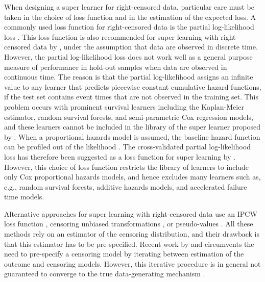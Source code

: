 \documentclass[a4paper,danish]{article}
\newcommand{\1}{\mathds{1}}
\theoremstyle{plain} %
\numberwithin{theorem}{section}
\theoremstyle{definition} %
\theoremstyle{remark}
\begin{document}
When designing a super learner for right-censored data, particular
care must be taken in the choice of loss function and in the
estimation of the expected loss. A commonly used loss function for
right-censored data is the partial log-likelihood loss
\citep[e.g.,][]{li2016regularized,yao2017deep,lee2018deephit,katzman2018deepsurv,gensheimer2019scalable,lee2021boosted,kvamme2021continuous}.
This loss function is also recommended for super learning with
right-censored data by \cite{polley2011-sl-cens}, under the assumption
that data are observed in discrete time. However, the partial
log-likelihood loss does not work well as a general purpose measure of
performance in hold-out samples when data are observed in continuous
time. The reason is that the partial log-likelihood assigns an
infinite value to any learner that predicts piecewise constant
cumulative hazard functions, if the test set contains event times that
are not observed in the training set. This problem occurs with
prominent survival learners including the Kaplan-Meier estimator,
random survival forests, and semi-parametric Cox regression models,
and these learners cannot be included in the library of the super
learner proposed by \cite{polley2011-sl-cens}. When a proportional
hazards model is assumed, the baseline hazard function can be profiled
out of the likelihood \citep{cox1972regression}. The cross-validated
partial log-likelihood loss \citep{verweij1993cross} has therefore
been suggested as a loss function for super learning by
\cite{golmakani2020super}. However, this choice of loss function
restricts the library of learners to include only Cox proportional
hazards models, and hence excludes many learners such as, e.g., random
survival forests, additive hazards models, and accelerated failure
time models.

Alternative approaches for super learning with right-censored data use
an IPCW loss function
\citep{graf1999assessment,van2003unicv,molinaro2004tree,keles2004asymptotically,hothorn2006survival,gerds2006consistent,gonzalez2021stacked},
censoring unbiased transformations
\citep{fan1996local,steingrimsson2019censoring}, or pseudo-values
\citep{andersen2003generalised,mogensen2013random,sachs2019ensemble}.
All these methods rely on an estimator of the censoring distribution,
and their drawback is that this estimator has to be pre-specified.
Recent work by \cite{han2021inverse} and \cite{westling2021inference}
circumvents the need to pre-specify a censoring model by iterating
between estimation of the outcome and censoring models. However, this
iterative procedure is in general not guaranteed to converge to the
true data-generating mechanism
\citep[][Appendix~A.4]{munch2024thesis}.
\end{document}
